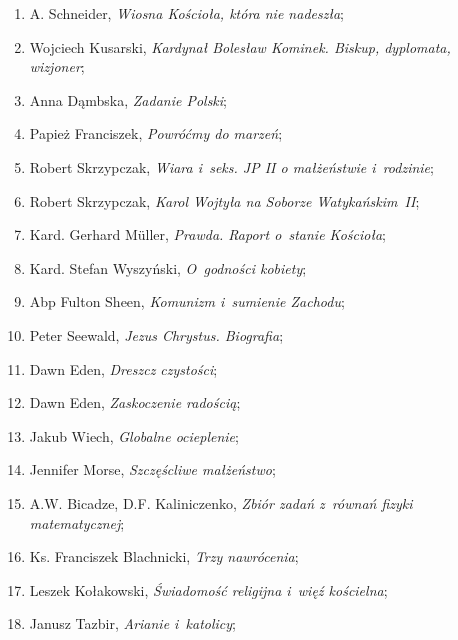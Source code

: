 \documentclass[a4paper,11pt]{article}
\begin{document}
\begin{enumerate}

\item A. Schneider, \textit{Wiosna Kościoła, która nie nadeszła};

\item Wojciech Kusarski, \textit{Kardynał Bolesław Kominek. Biskup,
  dyplomata, wizjoner};

\item Anna Dąmbska, \textit{Zadanie Polski};

\item Papież Franciszek, \textit{Powróćmy do marzeń};

\item Robert Skrzypczak, \textit{Wiara i~seks. JP II o małżeństwie
    i~rodzinie};

\item Robert Skrzypczak, \textit{Karol Wojtyła na Soborze Watykańskim~II};

\item Kard. Gerhard M\"{u}ller, \textit{Prawda. Raport o~stanie Kościoła};

\item Kard. Stefan Wyszyński, \textit{O~godności kobiety};

\item Abp Fulton Sheen, \textit{Komunizm i~sumienie Zachodu};

\item Peter Seewald, \textit{Jezus Chrystus. Biografia};

\item Dawn Eden, \textit{Dreszcz czystości};

\item Dawn Eden, \textit{Zaskoczenie radością};

\item Jakub Wiech, \textit{Globalne ocieplenie};

\item Jennifer Morse, \textit{Szczęścliwe małżeństwo};

\item A.W. Bicadze, D.F. Kaliniczenko, \textit{Zbiór zadań z~równań fizyki
    matematycznej};

\item Ks. Franciszek Blachnicki, \textit{Trzy nawrócenia};

\item Leszek Kołakowski, \textit{Świadomość religijna i~więź kościelna};

\item Janusz Tazbir, \textit{Arianie i~katolicy};


\end{enumerate}
\end{document}
